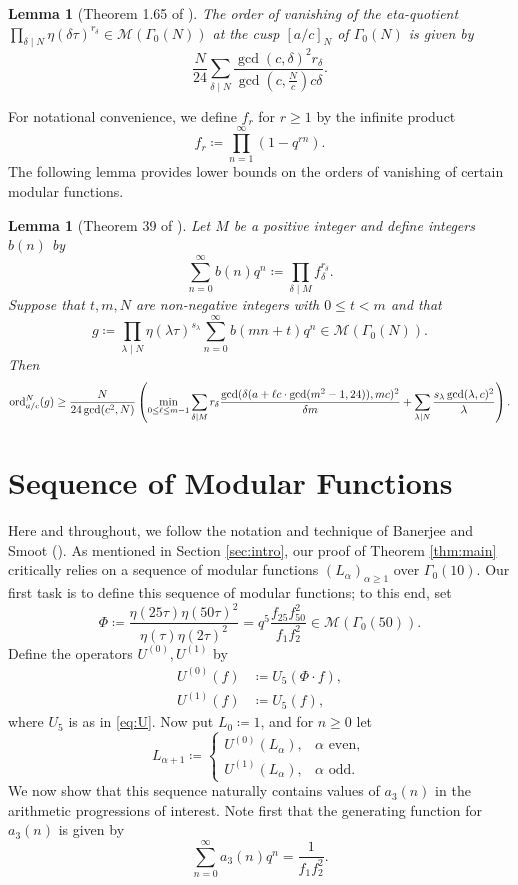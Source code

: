 \documentclass[12pt, reqno]{amsart}
\newtheorem{lem}[thm]{Lemma}
\theoremstyle{definition}
\theoremstyle{remark}
\begin{document}
\begin{lem}[Theorem 1.65 of \cite{OnoWeb}]\label{lem:eta-quotient2}
The order of vanishing of the eta-quotient 
$\prod\limits_{\delta \mid N} \eta(\delta \tau)^{r_\delta} \in \mathcal{M}(\Gamma_0(N))$ at the cusp $[a/c]_N$ of $\Gamma_0(N)$ is given by
\[\frac{N}{24} \sum\limits_{\delta \mid N} \frac{\gcd(c,\delta)^2r_\delta}{\gcd(c,\frac{N}{c})c\delta}.\]
\end{lem}

For notational convenience, we define $f_r$ for $r \geq 1$ by the infinite product
\[f_r \coloneqq \prod\limits_{n=1}^\infty (1-q^{rn}).\]
The following lemma provides lower bounds on the orders of vanishing of certain modular functions.

\begin{lem}[Theorem 39 of \cite{Radu}]\label{lem:oov_bound}
Let $M$ be a positive integer and define integers $b(n)$ by 
\[\sum\limits_{n=0}^\infty b(n) q^n \coloneqq \prod\limits_{\delta \mid M} f_{\delta}^{r_\delta}.\]
Suppose that $t,m,N$ are non-negative integers with $0 \leq t < m$ and that
\[g \coloneqq \prod\limits_{\lambda \mid N} \eta(\lambda \tau)^{s_{\lambda}} \sum\limits_{n=0}^\infty b(mn+t) q^n \in \mathcal{M}(\Gamma_0(N)).\]
Then 
\[\textup{ord}_{a/c}^N(g) \geq \frac{N}{24\gcd(c^2,N)}\left(\min\limits_{0 \leq \ell \leq m-1} \sum\limits_{\delta \mid M} r_\delta \frac{\gcd(\delta(a+\ell c \cdot \gcd(m^2-1,24)),mc)^2}{\delta m}+\sum\limits_{\lambda \mid N} \frac{s_\lambda \gcd(\lambda,c)^2}{\lambda}\right).\]
\end{lem}


\section{Sequence of Modular Functions}\label{sec:seq}
Here and throughout, we follow the notation and technique of Banerjee and Smoot (\cite{BS}). As mentioned in Section \ref{sec:intro}, our proof of Theorem \ref{thm:main} critically relies on a sequence of modular functions $(L_\alpha)_{\alpha \geq 1}$ over $\Gamma_0(10)$. Our first task is to define this sequence of modular functions; to this end, set
\[\Phi \coloneqq \frac{\eta(25\tau)\eta(50\tau)^2}{\eta(\tau)\eta(2\tau)^2} = q^5 \frac{f_{25}f_{50}^2}{f_1f_2^2} \in \mathcal{M}(\Gamma_0(50)).\]
Define the operators $U^{(0)}, U^{(1)}$ by 
\begin{align*} 
U^{(0)} (f) &\coloneqq U_5(\Phi \cdot f), \\
U^{(1)} (f) &\coloneqq U_5(f),
\end{align*} 
where $U_5$ is as in \eqref{eq:U}. Now put $L_0 \coloneqq 1$, and for $n \geq 0$ let
\begin{equation}\label{eq:Ldef}
L_{\alpha+1} \coloneqq \begin{cases}  U^{(0)}(L_{\alpha}), & \alpha \text{ even},  \\ U^{(1)}(L_{\alpha}), & \alpha \text{ odd}. \end{cases}
\end{equation}
We now show that this sequence naturally contains values of $a_3(n)$ in the arithmetic progressions of interest. Note first that the generating function for $a_3(n)$ is given by 
\[\sum\limits_{n=0}^\infty a_3(n) q^n = \frac{1}{f_1 f_2^2}.\]
\end{document}
